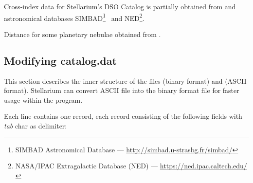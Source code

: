 \noindent Cross-index data for Stellarium's DSO Catalog is partially obtained from 
 and astronomical databases 
SIMBAD\footnote{SIMBAD Astronomical Database --- \url{http://simbad.u-strasbg.fr/simbad/}}~\citep{2000A&AS..143....9W} 
and NED\footnote{NASA/IPAC Extragalactic Database (NED) --- \url{https://ned.ipac.caltech.edu/}}.

\noindent Distance for some planetary nebulae obtained from .

\subsection{Modifying catalog.dat}
\label{sec:dso:modifyingCatalog.dat}

This section describes the inner structure of the files 
(binary format) and  (ASCII format).
Stellarium can convert ASCII file into the binary format file for faster usage
within the program.

Each line contains one record, each record consisting of the following
fields with \emph{tab} char as delimiter:

